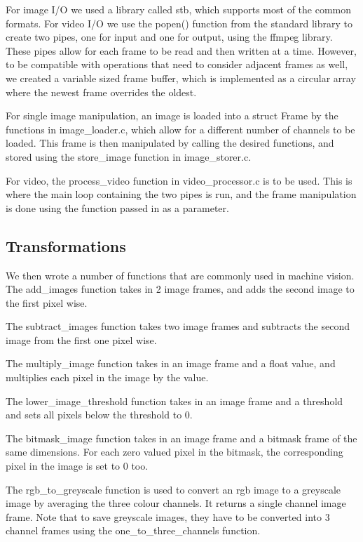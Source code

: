 \documentclass[11pt]{article}
\begin{document}
%
For image I/O we used a library called stb, which supports most of the common formats. For video I/O we use the popen() function from the standard library to create two pipes, one for input and one for output, using the ffmpeg library. These pipes allow for each frame to be read and then written at a time. However, to be compatible with operations that need to consider adjacent frames as well, we created a variable sized frame buffer, which is implemented as a circular array where the newest frame overrides the oldest.

%
For single image manipulation, an image is loaded into a struct Frame by the functions in image\_loader.c, which allow for a different number of channels to be loaded. This frame is then manipulated by calling the desired functions, and stored using the store\_image function in image\_storer.c.

%
For video, the process\_video function in video\_processor.c is to be used. This is where the main loop containing the two pipes is run, and the frame manipulation is done using the function passed in as a parameter.

  \subsection*{Transformations}
We then wrote a number of functions that are commonly used in machine vision. The add\_images function takes in 2 image frames, and adds the second image to the first pixel wise.

%
The subtract\_images function takes two image frames and subtracts the second image from the first one pixel wise.

%
The multiply\_image function takes in an image frame and a float value, and multiplies each pixel in the image by the value.

%
The lower\_image\_threshold function takes in an image frame and a threshold and sets all pixels below the threshold to 0.

%
The bitmask\_image function takes in an image frame and a bitmask frame of the same dimensions. For each zero valued pixel in the bitmask, the corresponding pixel in the image is set to 0 too.

%
The rgb\_to\_greyscale function is used to convert an rgb image to a greyscale image by averaging the three colour channels. It returns a single channel image frame. Note that to save greyscale images, they have to be converted into 3 channel frames using the  one\_to\_three\_channels function.
\end{document}
